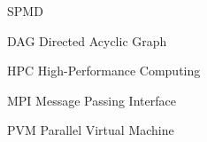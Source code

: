 \begin{listofabbrv}{SPMD}
        \item[DAG] Directed Acyclic Graph
        \item[HPC] High-Performance Computing
        \item[MPI] Message Passing Interface
        \item[PVM] Parallel Virtual Machine
\end{listofabbrv}


\listoffigures

\listoftables

\tableofcontents